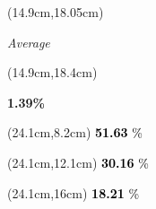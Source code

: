 \documentclass[
  11pt,
  landscape]{article}
\begin{document}
\begin{textblock*}{5cm}(14.9cm,18.05cm) %
    \small \centerline{\textit{Average}}
\end{textblock*}

\begin{textblock*}{5cm}(14.9cm,18.4cm) %
    \centerline{\textbf{1.39\%}}
\end{textblock*}

\begin{textblock*}{3cm}(24.1cm,8.2cm) %
  \huge \textcolor{black}{\textbf{51.63} \huge \%}
\end{textblock*}

\begin{textblock*}{3cm}(24.1cm,12.1cm) %
  \huge \textcolor{black}{\textbf{30.16} \huge \%}
\end{textblock*}

\begin{textblock*}{3cm}(24.1cm,16cm) %
  \huge \textcolor{black}{\textbf{18.21} \huge \%}
\end{textblock*}

\vspace{2.75em}
\end{document}

